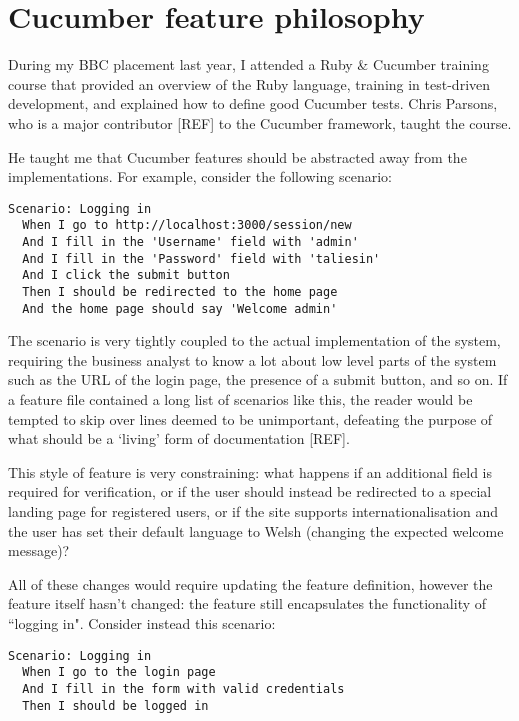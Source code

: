 \chapter{Cucumber feature philosophy}
\label{appendix:cucumber}

During my BBC placement last year, I attended a Ruby \& Cucumber training course that provided an overview of the Ruby language, training in test-driven development, and explained how to define good Cucumber tests.  Chris Parsons, who is a major contributor [REF] to the Cucumber framework, taught the course. %

He taught me that Cucumber features should be abstracted away from the implementations. For example, consider the following scenario:

\begin{lstlisting}
Scenario: Logging in
  When I go to http://localhost:3000/session/new
  And I fill in the 'Username' field with 'admin'
  And I fill in the 'Password' field with 'taliesin'
  And I click the submit button
  Then I should be redirected to the home page
  And the home page should say 'Welcome admin'
\end{lstlisting}

The scenario is very tightly coupled to the actual implementation of the system, requiring the business analyst to know a lot about low level parts of the system such as the URL of the login page, the presence of a submit button, and so on. If a feature file contained a long list of scenarios like this, the reader would be tempted to skip over lines deemed to be unimportant, defeating the purpose of what should be a `living' form of documentation [REF]. %

This style of feature is very constraining: what happens if an additional field is required for verification, or if the user should instead be redirected to a special landing page for registered users, or if the site supports internationalisation and the user has set their default language to Welsh (changing the expected welcome message)?

All of these changes would require updating the feature definition, however the feature itself hasn't changed: the feature still encapsulates the functionality of ``logging in". Consider instead this scenario:

\begin{lstlisting}
Scenario: Logging in
  When I go to the login page
  And I fill in the form with valid credentials
  Then I should be logged in
 \end{lstlisting}

